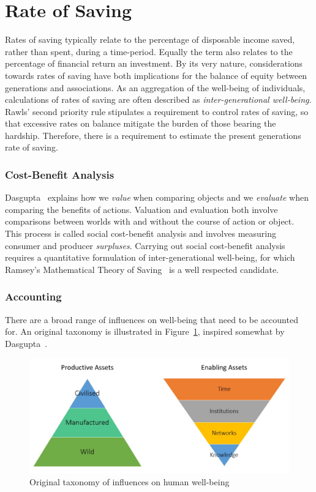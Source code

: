 \documentclass[11pt, oneside]{book}   	%
\begin{document}
\section{Rate of Saving}
Rates of saving typically relate to the percentage of disposable income saved, rather than spent, during a time-period.
Equally the term also relates to the percentage of financial return an investment.
By its very nature, considerations towards rates of saving have both implications for the balance of equity between generations and associations.
As an aggregation of the well-being of individuals, calculations of rates of saving are often described as \emph{inter-generational well-being}.
Rawls' second priority rule stipulates a requirement to control rates of saving, so that excessive rates on balance mitigate the burden of those bearing the hardship.
Therefore, there is a requirement to estimate the present generations rate of saving.

\subsubsection{Cost-Benefit Analysis}

Dasgupta~\cite{pd2} explains how we \emph{value} when comparing objects and we \emph{evaluate} when comparing the benefits of actions.
Valuation and evaluation both involve comparisons between worlds with and without the course of action or object.
This process is called social cost-benefit analysis and involves measuring consumer and producer \emph{surpluses}.
Carrying out social cost-benefit analysis requires a quantitative formulation of inter-generational well-being, for which Ramsey's Mathematical Theory of Saving~\cite{fr1} is a well respected candidate.

\subsubsection{Accounting}

There are a broad range of influences on well-being that need to be accounted for. An original taxonomy is illustrated in Figure~\ref{Influences on well-being figure}, inspired somewhat by Dasgupta~\cite{pd3}.

\begin{figure}[H]
\begin{center}
\includegraphics[width=1\textwidth]{productiveAssetTaxonomy.png}
\caption{Original taxonomy of influences on human well-being}
\label{Influences on well-being figure}
\end{center}
\end{figure}
\end{document}

